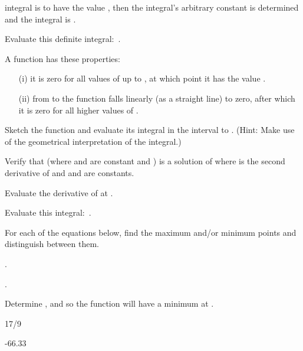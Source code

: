 {\begin{two-digit-list}
integral is to have the value , then the integral's arbitrary constant is
determined and the integral is .
\item [14.] Evaluate this definite integral: \,.
\item [15.] A function  has these properties:
\begin{itemize}
\item [(i)] it is zero for all values of  up to , at which point it has
the value .
\item [(ii)] from  to  the function falls linearly (as a
straight line) to zero, after which it is zero for all higher values of .
\end{itemize}
Sketch the function and evaluate its integral in the interval  to
.
(Hint: Make use of the geometrical interpretation of the integral.)
\item [16.] Verify that  (where 
and  are constant and ) is a solution of
%
%
where  is the second derivative of  and  and  are
constants.
\item [17.] Evaluate the derivative of  at .
\item [18.] Evaluate this integral: \,.
\item [19.] For each of the equations below, find the maximum and/or minimum
points and distinguish between them.
\begin{one-digit-list}
\item [a.] .
\item [b.] .
\item [c.] Determine ,  and  so the function  will
have a minimum at .
\end{one-digit-list}
\end{two-digit-list}

\BriefAns
\begin{two-digit-list}
\item [3.] 

\item [6.] 17/9

\item [7.] -66.33


\end{two-digit-list}}
